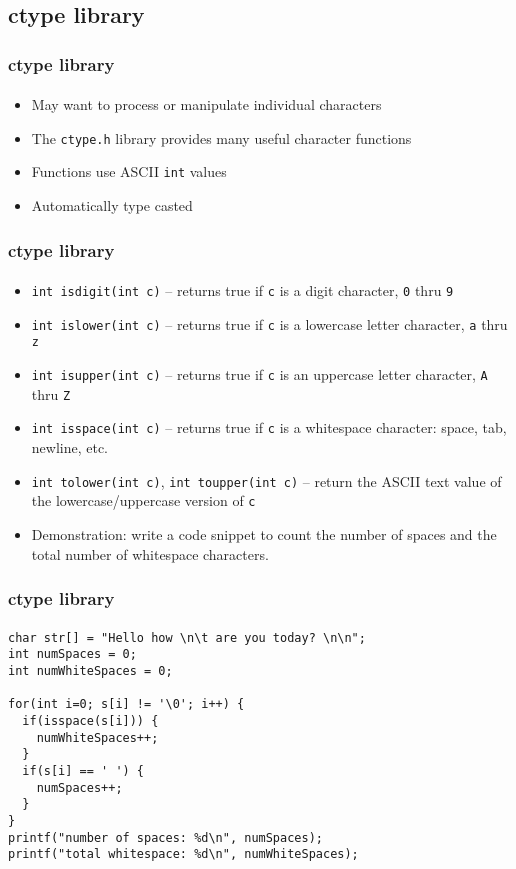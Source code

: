 \documentclass[]{beamer}
\begin{document}
\subsection{ctype library}

\begin{frame}[fragile]
  \frametitle{ctype library}
  \framesubtitle{}
  
\begin{itemize}[<+->]
  \item May want to process or manipulate individual characters
  \item The \texttt{ctype.h} library provides many useful character functions
  \item Functions use ASCII \texttt{int} values
  \item Automatically type casted 
\end{itemize}

    
\end{frame}


\begin{frame}[fragile]
  \frametitle{ctype library}
  \framesubtitle{}
  
\begin{itemize}[<+->]  \item \texttt{int isdigit(int c)} -- returns true if \texttt{c} is a digit character, \texttt{0} thru \texttt{9}
  \item \texttt{int islower(int c)} -- returns true if \texttt{c} is a lowercase letter character, \texttt{a} thru \texttt{z}
  \item \texttt{int isupper(int c)} -- returns true if \texttt{c} is an uppercase letter character, \texttt{A} thru \texttt{Z}
  \item \texttt{int isspace(int c)} -- returns true if \texttt{c} is a whitespace character: space, tab, newline, etc.
  \item \texttt{int tolower(int c)}, \texttt{int toupper(int c)} -- return the ASCII text value of the lowercase/uppercase version of \texttt{c}
  \item Demonstration: write a code snippet to count the number of spaces and the total number of whitespace characters.
\end{itemize}

\end{frame}


\begin{frame}[fragile]
  \frametitle{ctype library}
  \framesubtitle{}

\begin{verbatim}
char str[] = "Hello how \n\t are you today? \n\n";
int numSpaces = 0;
int numWhiteSpaces = 0;

for(int i=0; s[i] != '\0'; i++) {
  if(isspace(s[i])) {
    numWhiteSpaces++;
  }
  if(s[i] == ' ') {
    numSpaces++;
  }
}
printf("number of spaces: %d\n", numSpaces);
printf("total whitespace: %d\n", numWhiteSpaces);
\end{verbatim}
    
\end{frame}
\end{document}
